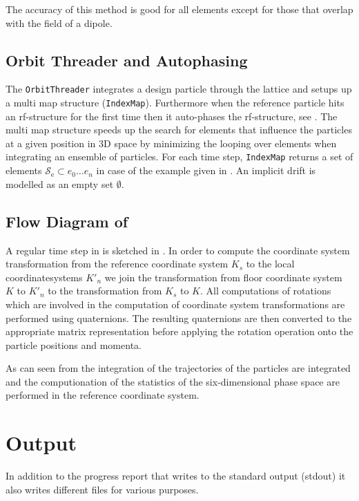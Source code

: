 The accuracy of this method is good for all elements except for those that overlap with the field of a dipole.

\subsection{Orbit Threader and Autophasing}
\label{sec:orbitthreader}
The \texttt{OrbitThreader} integrates a design particle through the lattice and setups up a multi map structure (\texttt{IndexMap}). Furthermore when the reference particle hits an rf-structure for the first time then it auto-phases the rf-structure, see . The multi map structure speeds up the search for elements that influence the particles at a given position in 3D space by minimizing the looping over elements when integrating an ensemble of particles. For each time step, \texttt{IndexMap} returns a set of elements $\mathcal{S}_{\text{e}} \subset {e_0 \ldots e_n}$ in case of the example given in . An implicit drift is modelled as an empty set $\emptyset$.

\subsection{Flow Diagram of \opalt}

A regular time step in \opalt is sketched in . In order to compute the coordinate system transformation from the reference coordinate system $K_s$ to the local coordinatesystems $K'_n$ we join the transformation from floor coordinate system $K$ to $K'_n$ to the transformation from $K_s$ to $K$. All computations of rotations which are involved in the computation of coordinate system transformations are performed using quaternions. The resulting quaternions are then converted to the appropriate matrix representation before applying the rotation operation onto the particle positions and momenta.

As can seen from  the integration of the trajectories of the particles are integrated and the computionation of the statistics of the six-dimensional phase space are performed in the reference coordinate system.

\section{Output}
In addition to the progress report that \opalt writes to the standard output (stdout) it also writes different files for various purposes.
